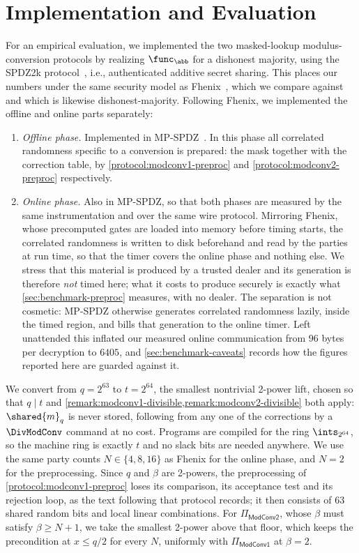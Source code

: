 \section{Implementation and Evaluation}
\label{sec:benchmark}

For an empirical evaluation, we implemented the two masked-lookup modulus-conversion protocols by realizing $\func_\abb$ for a dishonest majority, using the SPDZ2k protocol~\cite{C:CDESX18}, i.e., authenticated additive secret sharing.
This places our numbers under the same security model as Fhenix~\cite{CCS:ZZLP25}, which we compare against and which is likewise dishonest-majority.
Following Fhenix, we implemented the offline and online parts separately:
\begin{enumerate}
    \item
        \emph{Offline phase.}
        Implemented in MP-SPDZ~\cite{EPRINT:Keller20}.
        In this phase all correlated randomness specific to a conversion is prepared: the mask together with the correction table, by \cref{protocol:modconv1-preproc} and \cref{protocol:modconv2-preproc} respectively.
    \item
        \emph{Online phase.}
        Also in MP-SPDZ, so that both phases are measured by the same instrumentation and over the same wire protocol.
        Mirroring Fhenix, whose precomputed gates are loaded into memory before timing starts, the correlated randomness is written to disk beforehand and read by the parties at run time, so that the timer covers the online phase and nothing else.
        We stress that this material is produced by a trusted dealer and its generation is therefore \emph{not} timed here; what it costs to produce securely is exactly what \cref{sec:benchmark-preproc} measures, with no dealer.
        The separation is not cosmetic: MP-SPDZ otherwise generates correlated randomness lazily, inside the timed region, and bills that generation to the online timer.
        Left unattended this inflated our measured online communication from $96$ bytes per decryption to $6405$, and \cref{sec:benchmark-caveats} records how the figures reported here are guarded against it.
\end{enumerate}

We convert from $q = 2^{63}$ to $t = 2^{64}$, the smallest nontrivial 2-power lift, chosen so that $q \mid t$ and \cref{remark:modconv1-divisible,remark:modconv2-divisible} both apply: $\shared{m}_q$ is never stored, following from any one of the corrections by a $\DivModConv$ command at no cost.
Programs are compiled for the ring $\ints_{2^{64}}$, so the machine ring is exactly $t$ and no slack bits are needed anywhere.
We use the same party counts $N \in \{4, 8, 16\}$ as Fhenix for the online phase, and $N = 2$ for the preprocessing.
Since $q$ and $\beta$ are 2-powers, the preprocessing of \cref{protocol:modconv1-preproc} loses its comparison, its acceptance test and its rejection loop, as the text following that protocol records; it then consists of $63$ shared random bits and local linear combinations.
For $\Pi_\mathsf{ModConv2}$, whose $\beta$ must satisfy $\beta \ge N+1$, we take the smallest 2-power above that floor, which keeps the precondition at $x \le q/2$ for every $N$, uniformly with $\Pi_\mathsf{ModConv1}$ at $\beta = 2$.

